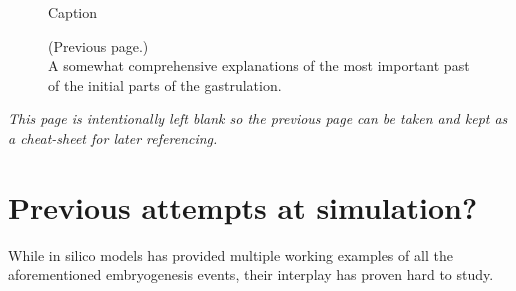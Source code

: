 \begin{figure}[H]
    \centering
    \vspace*{-1cm}
    \caption{Caption}
    \label{fig:big-timeline}
\end{figure}
\newpage
\addtocounter{figure}{-1}
\begin{figure} [t!]
  \caption{(Previous page.) \\ A somewhat comprehensive explanations of the most important past of the initial parts of the gastrulation.
  }
\end{figure}
\vspace*{5cm} 
\textit{This page is intentionally left blank so the previous page can be taken and kept as a cheat-sheet for later referencing. }
\newpage
\section{Previous attempts at simulation?}
While in silico models has provided multiple working examples of all the aforementioned embryogenesis events, their interplay has proven hard to study.

